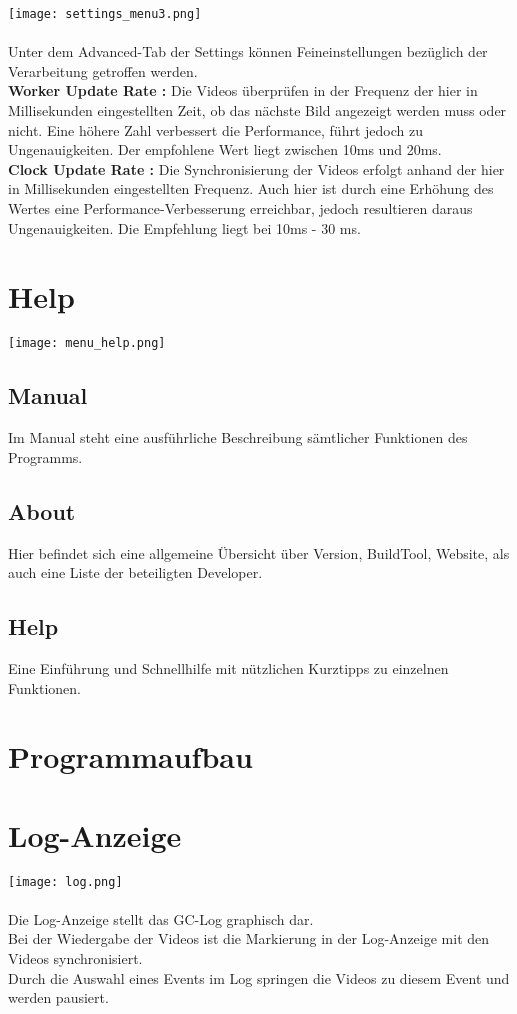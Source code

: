 \texttt{[image: settings\_menu3.png]}\\
\\
Unter dem Advanced-Tab der Settings können Feineinstellungen bezüglich der Verarbeitung getroffen werden. \\
\textbf{Worker Update Rate : } Die Videos überprüfen in der Frequenz der hier in Millisekunden eingestellten Zeit, ob das nächste Bild angezeigt werden muss oder nicht. Eine höhere Zahl verbessert die Performance, führt jedoch zu Ungenauigkeiten. Der empfohlene Wert liegt zwischen 10ms und 20ms.\\
\textbf{Clock Update Rate : } Die Synchronisierung der Videos erfolgt anhand der hier in Millisekunden eingestellten Frequenz. Auch hier ist durch eine Erhöhung des Wertes eine Performance-Verbesserung erreichbar, jedoch resultieren daraus Ungenauigkeiten. Die Empfehlung liegt bei 10ms - 30 ms.\\

\section{Help}
\texttt{[image: menu\_help.png]}\\
\subsection{Manual}
Im Manual steht eine ausführliche Beschreibung sämtlicher Funktionen des Programms.\\
\subsection{About}
Hier befindet sich eine allgemeine Übersicht über Version, BuildTool, Website, als auch eine Liste der beteiligten Developer. \\
\subsection{Help}
Eine Einführung und Schnellhilfe mit nützlichen Kurztipps zu einzelnen Funktionen. 
\section*{Programmaufbau}
\section{Log-Anzeige}
\texttt{[image: log.png]}\\
\\
Die Log-Anzeige stellt das GC-Log graphisch dar.\\
Bei der Wiedergabe der Videos ist die Markierung in der Log-Anzeige mit den Videos synchronisiert. \\
Durch die Auswahl eines Events im Log springen die Videos zu diesem Event und werden pausiert. \\
 
